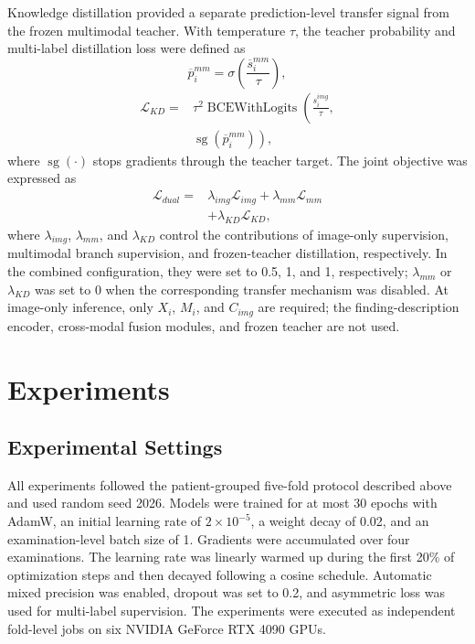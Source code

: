 \documentclass[Afour,sagev,times]{sagej}
\begin{document}
Knowledge distillation provided a separate prediction-level transfer signal from the frozen multimodal teacher. With temperature $\tau$, the teacher probability and multi-label distillation loss were defined as
\begin{equation}
\overline{p}_i^{mm}=\sigma\!\left(\frac{\overline{s}_i^{mm}}{\tau}\right),
\end{equation}
\begin{equation}
\begin{aligned}
\mathcal{L}_{KD}={}&\tau^2\operatorname{BCEWithLogits}\!\left(
\frac{s_i^{img}}{\tau},\right.\\
&\left.\operatorname{sg}(\overline{p}_i^{mm})\right),
\end{aligned}
\end{equation}
where $\operatorname{sg}(\cdot)$ stops gradients through the teacher target. The joint objective was expressed as
\begin{equation}
\begin{aligned}
\mathcal{L}_{dual}={}&\lambda_{img}\mathcal{L}_{img}+\lambda_{mm}\mathcal{L}_{mm}\\
&+\lambda_{KD}\mathcal{L}_{KD},
\end{aligned}
\end{equation}
where $\lambda_{img}$, $\lambda_{mm}$, and $\lambda_{KD}$ control the contributions of image-only supervision, multimodal branch supervision, and frozen-teacher distillation, respectively. In the combined configuration, they were set to 0.5, 1, and 1, respectively; $\lambda_{mm}$ or $\lambda_{KD}$ was set to 0 when the corresponding transfer mechanism was disabled. At image-only inference, only $X_i$, $M_i$, and $C_{img}$ are required; the finding-description encoder, cross-modal fusion modules, and frozen teacher are not used.

\section{Experiments}

\subsection{Experimental Settings}

All experiments followed the patient-grouped five-fold protocol described above and used random seed 2026. Models were trained for at most 30 epochs with AdamW, an initial learning rate of $2\times10^{-5}$, a weight decay of 0.02, and an examination-level batch size of 1. Gradients were accumulated over four examinations. The learning rate was linearly warmed up during the first 20\% of optimization steps and then decayed following a cosine schedule. Automatic mixed precision was enabled, dropout was set to 0.2, and asymmetric loss was used for multi-label supervision. The experiments were executed as independent fold-level jobs on six NVIDIA GeForce RTX 4090 GPUs.
\end{document}
